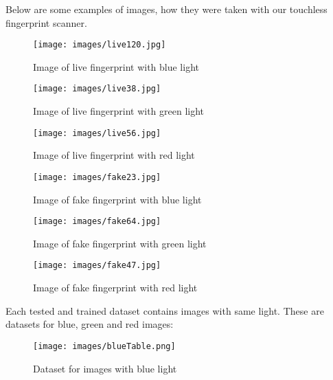 \documentclass{article}
\begin{document}
Below are some examples of images, how they were taken with our touchless fingerprint scanner.

\begin{figure}[!htbp]
  \begin{minipage}[b]{0.3\linewidth}
    \centering
    \texttt{[image: images/live120.jpg]}
    \caption{Image of live fingerprint with blue light}
  \end{minipage}
  \hspace{0.3cm}
  \begin{minipage}[b]{0.3\linewidth}
    \centering
    \texttt{[image: images/live38.jpg]}
    \caption{Image of live fingerprint with green light}
  \end{minipage}
  \hspace{0.3cm}
    \begin{minipage}[b]{0.3\linewidth}
    \centering
    \texttt{[image: images/live56.jpg]}
    \caption{Image of live fingerprint with red light}
  \end{minipage}
\end{figure}

\begin{figure}[!htbp]
  \begin{minipage}[b]{0.3\linewidth}
    \centering
    \texttt{[image: images/fake23.jpg]}
    \caption{Image of fake fingerprint with blue light}
  \end{minipage}
  \hspace{0.3cm}
  \begin{minipage}[b]{0.3\linewidth}
    \centering
    \texttt{[image: images/fake64.jpg]}
    \caption{Image of fake fingerprint with green light}
  \end{minipage}
  \hspace{0.3cm}
    \begin{minipage}[b]{0.3\linewidth}
    \centering
    \texttt{[image: images/fake47.jpg]}
    \caption{Image of fake fingerprint with red light}
  \end{minipage}
\end{figure}

Each tested and trained dataset contains images with same light. These are datasets for blue, green and red images:
\begin{figure}[!htbp]
    \centering
    \texttt{[image: images/blueTable.png]}
    \caption{Dataset for images with blue light}
\end{figure}
\end{document}
